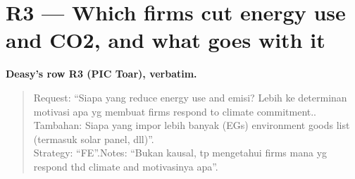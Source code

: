 
\clearpage
\section{R3 --- Which firms cut energy use and CO2, and what goes with it}

{\small\textbf{Deasy's row R3 (PIC Toar), verbatim.}}
\begin{quote}\small
Request: ``Siapa yang reduce energy use and emisi? Lebih ke determinan motivasi apa yg membuat firms respond to climate
commitment.. Tambahan: Siapa yang impor lebih banyak (EGs) environment goods list (termasuk solar panel, dll)''.\\
Strategy: ``FE''.\quad Notes: ``Bukan kausal, tp mengetahui firms mana yg respond thd climate and motivasinya apa''.
\end{quote}


